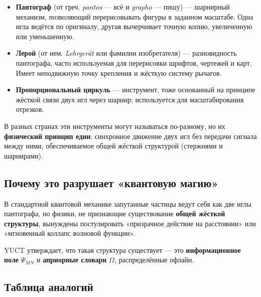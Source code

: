 \documentclass[12pt,a4paper]{article}
\begin{document}
	\begin{itemize}
		\item \textbf{Пантограф} (от греч. \textit{pantos} — всё и \textit{grapho} — пишу) — шарнирный механизм, позволяющий перерисовывать фигуры в заданном масштабе. Одна игла ведётся по оригиналу, другая вычерчивает точную копию, увеличенную или уменьшенную.
		\item \textbf{Лерой} (от нем. \textit{Lehrgerät} или фамилии изобретателя) — разновидность пантографа, часто используемая для перерисовки шрифтов, чертежей и карт. Имеет неподвижную точку крепления и жёсткую систему рычагов.
		\item \textbf{Пропорциональный циркуль} — инструмент, тоже основанный на принципе жёсткой связи двух игл через шарнир; используется для масштабирования отрезков.
	\end{itemize}
	
	В разных странах эти инструменты могут называться по-разному, но их \textbf{физический принцип един}: синхронное движение двух игл без передачи сигнала между ними, обеспечиваемое общей жёсткой структурой (стержнями и шарнирами).
	
	\subsection{Почему это разрушает «квантовую магию»}
	
	В стандартной квантовой механике запутанные частицы ведут себя как две иглы пантографа, но физики, не признающие существование \textbf{общей жёсткой структуры}, вынуждены постулировать «призрачное действие на расстоянии» или «мгновенный коллапс волновой функции».
	
	YUCT утверждает, что такая структура существует — это \textbf{информационное поле} \(\Psi_{MN}\) и \textbf{априорные словари} \(\Omega\), распределённые офлайн.
	
	\subsection{Таблица аналогий}
	
\end{document}
